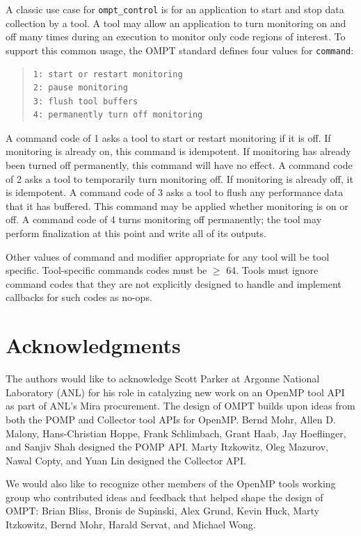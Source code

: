 \documentclass{article}
\begin{document}
\noindent A classic use case for \lstinline|ompt_control|  is for an application to start and stop data collection by a tool. A tool may allow an application to turn monitoring on and off many times during an execution to monitor only code regions of interest.
To support this common usage,  the OMPT standard defines four values for \lstinline|command|:

 \begin{quote}
\begin{lstlisting}
1: start or restart monitoring
2: pause monitoring
3: flush tool buffers 
4: permanently turn off monitoring
\end{lstlisting}
\end{quote}

\noindent
%
A command code of 1 asks a tool to start or restart monitoring if it is off. If monitoring is already on, this command is idempotent. If monitoring has already been turned off permanently, this command will have no effect. 
%
A command code of 2 asks a tool to temporarily turn monitoring off. If monitoring is already off, it is idempotent. 
% 
A command code of 3 asks a tool to flush any performance data that it has buffered. This command may be applied whether monitoring is on or off.
%
A command code of 4 turns monitoring off permanently;  the tool may perform finalization at this point and write all of its outputs. 

Other values of command  and modifier appropriate for any tool will be tool specific. Tool-specific commands codes must be $\geq$ 64. Tools must ignore command codes that they are not explicitly designed to handle and implement callbacks for such codes as no-ops.

\section*{Acknowledgments}

The authors would like to acknowledge Scott Parker at Argonne National Laboratory (ANL) for 
his role in catalyzing new work on an OpenMP tool API as part of ANL's Mira procurement.
The design of OMPT builds upon ideas from both the POMP and Collector tool APIs for OpenMP. 
Bernd Mohr, Allen D. Malony, Hans-Christian Hoppe, Frank Schlimbach, 
Grant Haab, Jay Hoeflinger, and Sanjiv Shah designed the POMP API. 
Marty Itzkowitz, Oleg Mazurov, Nawal Copty, and Yuan Lin designed the Collector API.

We would also like to recognize other members of the OpenMP tools working group who contributed ideas and feedback that helped shape the design of  OMPT: Brian Bliss, Bronis de Supinski, Alex Grund, Kevin Huck, Marty Itzkowitz, Bernd Mohr, Harald Servat, and Michael Wong.
\end{document}

